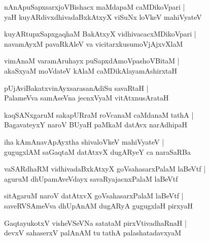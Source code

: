 \documentclass[twoside,12pt,openright]{book}
\newcounter{shloka}[chapter]
\begin{document}
\begin{shloka}%
nAnApuSapxsarxjoVBishacx maMdapaM caMDikoVpari |\\
yaH kuyARdivxdhivadaBxkAtxyX viSuNx loVkeV mahiVyateV 
\end{shloka}

\begin{shloka}%
kuyARtupxSapxgaqhaM BakAtxyX vidhivacacxMDikoVpari |\\
navamAyxM pavaRkAleV va vicitarxkusumoVjAjxvXlaM 
\end{shloka}

\begin{shloka}%
vimAnaM varamAruhayx puSapxdAmoVpashoVBitaM |\\
akaSxyaM moVdateV kAlaM caMDikAlayamAshirxtaH
\end{shloka}

\begin{shloka}%
pUjAviBakatxvinAyxsarasanAdiSu savaRtaH |\\
PalameVva samAseVna jecnxVyaM vitAtxnusArataH 
\end{shloka}

\begin{shloka}%
kaqSANxgaruM sakapURraM roVcanaM caMdanaM tathA |\\
BagavateyxY naroV BUyaH paMkaM datAvx narAdhipaH 
\end{shloka}

\begin{shloka}%
iha kAmAnavApAyxtha shivaloVkeV mahiVyateV |\\
gugugxlAM saGaqtaM datAtxvX dugARyeY ca naraSaRBa
\end{shloka}

\begin{shloka}%
vaSARdhaRM vidhivadaBxkAtxyX goVsahasarxPalaM laBeVtf |\\
aguruM dhUpamAveVdayx savaRyajacnxPalaM laBeVtf
\end{shloka}

\begin{shloka}%
sitAgaruM naroV datAtxvX goVsahasarxPalaM laBeVtf |\\
saveRVSAmeVva dhUpAnAM dugARyA gugugxlaH pirxyaH 
\end{shloka}

\begin{shloka}%
GaqtayukotxV visheVSeVNa satataM pirxVtivadhaRnaH |\\
devxV sahaserxV palAnAM tu tathA palashatadavxyaM 
\end{shloka}
\end{document}
